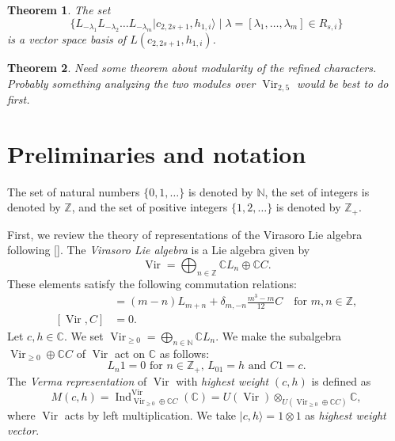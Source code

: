\documentclass[a4paper, 12pt, reqno]{amsart}
\newtheorem{theorem}{Theorem}[section]
\theoremstyle{remark}
\DeclareMathOperator{\Vir}{Vir}
\DeclareMathOperator{\Ind}{Ind}
\begin{document}
\begin{theorem}
  \label{thr:2}
  The set
  \begin{equation*}
    \{L_{-\lambda_1}L_{-\lambda_2}\dots L_{-\lambda_m}|c_{2, 2s + 1}, h_{1, i}\rangle \mid \lambda = [\lambda_1, \dots, \lambda_m] \in R_{s, i}\}
  \end{equation*}
  is a vector space basis of $L(c_{2, 2s + 1}, h_{1, i})$. 
\end{theorem}

\begin{theorem}
  \label{thr:3}
  Need some theorem about modularity of the refined characters.
  Probably something analyzing the two modules over $\Vir_{2, 5}$ would be best to do first. 
\end{theorem}

\section{Preliminaries and notation}
\label{sec:prel-notat}

The set of natural numbers $\{0, 1, \dots\}$ is denoted by $\mathbb{N}$, the set of integers is denoted by $\mathbb{Z}$, and the set of positive integers $\{1, 2, \dots\}$ is denoted by $\mathbb{Z}_+$.

First, we review the theory of representations of the Virasoro Lie algebra following [].
The \emph{Virasoro Lie algebra} is a Lie algebra given by
\begin{equation*}
  \Vir = \bigoplus_{n \in \mathbb{Z}}\mathbb{C}L_n \oplus \mathbb{C}C.
\end{equation*}
These elements satisfy the following commutation relations:
\begin{align*}
  [L_m, L_n] &= (m - n)L_{m + n} + \delta_{m, -n}\frac{m^3 - m}{12}C \quad \text{for $m, n \in \mathbb{Z}$}, \\
  [\Vir, C] &= 0.
\end{align*}
Let $c, h \in \mathbb{C}$.
We set $\Vir_{\ge 0} = \bigoplus_{n \in \mathbb{N}}\mathbb{C}L_n$.
We make the subalgebra $\Vir_{\ge 0} \oplus \mathbb{C}C$ of $\Vir$ act on $\mathbb{C}$ as follows:
\begin{equation*}
  \text{$L_n1 = 0$ for $n \in \mathbb{Z}_+$, $L_01 = h$ and $C1 = c$}.
\end{equation*}
The \emph{Verma representation} of $\Vir$ with \emph{highest weight} $(c, h)$ is defined as
\begin{equation*}
  M(c, h) = \Ind^{\Vir}_{\Vir_{\ge 0} \oplus \mathbb{C}C}(\mathbb{C}) = U(\Vir) \otimes_{U(\Vir_{\ge 0} \oplus \mathbb{C}C)} \mathbb{C},
\end{equation*}
where $\Vir$ acts by left multiplication.
We take $|c, h\rangle = 1 \otimes 1$ as \emph{highest weight vector}.
\end{document}
